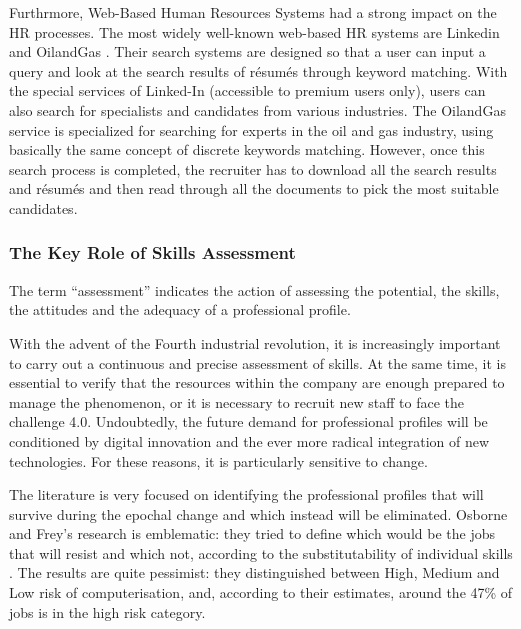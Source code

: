 \documentclass[]{book}
\begin{document}
Furthrmore, Web-Based Human Resources Systems had a strong impact on the
HR processes. The most widely well-known web-based HR systems are
Linkedin and OilandGas \citep{walker2001web}. Their search systems are
designed so that a user can input a query and look at the search results
of résumés through keyword matching. With the special services of
Linked-In (accessible to premium users only), users can also search for
specialists and candidates from various industries. The OilandGas
service is specialized for searching for experts in the oil and gas
industry, using basically the same concept of discrete keywords
matching. However, once this search process is completed, the recruiter
has to download all the search results and résumés and then read through
all the documents to pick the most suitable candidates.

\subsubsection{The Key Role of Skills
Assessment}\label{the-key-role-of-skills-assessment}

The term ``assessment'' indicates the action of assessing the potential,
the skills, the attitudes and the adequacy of a professional profile.

With the advent of the Fourth industrial revolution, it is increasingly
important to carry out a continuous and precise assessment of skills. At
the same time, it is essential to verify that the resources within the
company are enough prepared to manage the phenomenon, or it is necessary
to recruit new staff to face the challenge 4.0. Undoubtedly, the future
demand for professional profiles will be conditioned by digital
innovation and the ever more radical integration of new technologies.
For these reasons, it is particularly sensitive to change.

The literature is very focused on identifying the professional profiles
that will survive during the epochal change and which instead will be
eliminated. Osborne and Frey's research is emblematic: they tried to
define which would be the jobs that will resist and which not, according
to the substitutability of individual skills \citep{frey2017future}. The
results are quite pessimist: they distinguished between High, Medium and
Low risk of computerisation, and, according to their estimates, around
the 47\% of jobs is in the high risk category.
\end{document}
